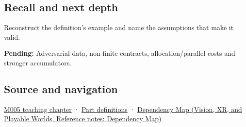 \subsection{Recall and next depth}\label{appendix-df318da57389-recall-and-next-depth}

Reconstruct the definition's example and name the assumptions that make it valid.

\textbf{Pending:} Adversarial data, non-finite contracts, allocation/parallel costs and stronger accumulators.

\subsection{Source and navigation}\label{appendix-df318da57389-source-and-navigation}

\hyperref[01-foundations-i-ch001-when-arithmetic-meets-uncertainty]{M005 teaching chapter} · \hyperref[appendix-fd090d982a15-m005---parts-77-88]{Part definitions} · \href{../07-Vision-XR-and-Playable-Worlds/main.pdf\#nameddest=appendix-4ad47bdd269a}{Dependency Map (Vision, XR, and Playable Worlds, Reference notes: Dependency Map)}
